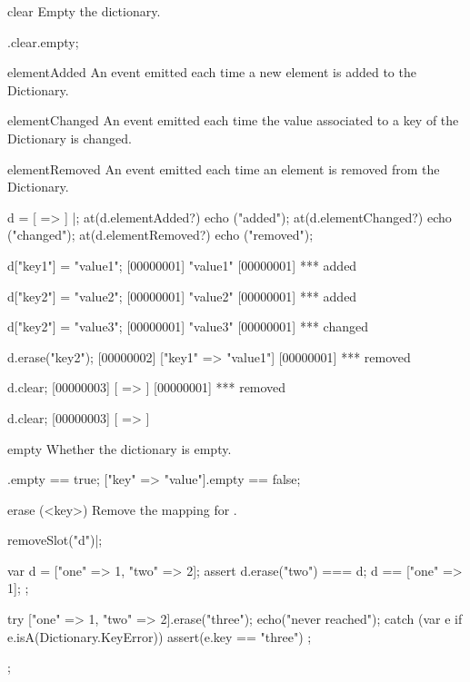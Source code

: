 \begin{urbiscriptapi}
\item[clear]
  Empty the dictionary.

\begin{urbiassert}
["one" => 1].clear.empty;
\end{urbiassert}


\item[elementAdded] An event emitted each time a new element is added to
  the Dictionary.


\item[elementChanged] An event emitted each time the value associated to a
  key of the Dictionary is changed.


\item[elementRemoved] An event emitted each time an element is removed from
  the Dictionary.

\begin{urbiscript}
d = [ => ] |;
at(d.elementAdded?) echo ("added");
at(d.elementChanged?) echo ("changed");
at(d.elementRemoved?) echo ("removed");

d["key1"] = "value1";
[00000001] "value1"
[00000001] *** added

d["key2"] = "value2";
[00000001] "value2"
[00000001] *** added

d["key2"] = "value3";
[00000001] "value3"
[00000001] *** changed

d.erase("key2");
[00000002] ["key1" => "value1"]
[00000001] *** removed

d.clear;
[00000003] [ => ]
[00000001] *** removed

d.clear;
[00000003] [ => ]
\end{urbiscript}


\item[empty]
  Whether the dictionary is empty.

\begin{urbiassert}
[=>].empty == true;
["key" => "value"].empty == false;
\end{urbiassert}


\item[erase](<key>) Remove the mapping for .
\begin{urbicomment}
removeSlot("d")|;
\end{urbicomment}
\begin{urbiscript}
{
  var d = ["one" => 1, "two" => 2];
  assert
  {
    d.erase("two") === d;
    d == ["one" => 1];
  };

  try
  {
    ["one" => 1, "two" => 2].erase("three");
    echo("never reached");
  }
  catch (var e if e.isA(Dictionary.KeyError))
  {
    assert(e.key == "three")
  };
};
\end{urbiscript}


\end{urbiscriptapi}
